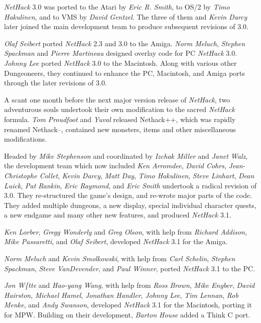 {\it NetHack\/} 3.0 was ported to the Atari by {\it Eric R. Smith}, to OS/2 by
{\it Timo Hakulinen}, and to VMS by {\it David Gentzel}.  The three of them
and {\it Kevin Darcy\/} later joined the main development team to produce
subsequent revisions of 3.0.

{\it Olaf Seibert\/} ported {\it NetHack\/} 2.3 and 3.0 to the Amiga.
{\it Norm Meluch}, {\it Stephen Spackman\/} and {\it Pierre Martineau\/} designed
overlay code for PC {\it NetHack\/} 3.0.  {\it Johnny Lee\/} ported
{\it NetHack\/} 3.0 to the Macintosh.  Along with various other Dungeoneers, they
continued to enhance the PC, Macintosh, and Amiga ports through the later
revisions of 3.0.

A scant one month before the next major version release of {\it NetHack}, two
adventurous souls undertook their own modification to the sacred {\it NetHack\/}
formula. {\it Tom Proudfoot\/} and {\it Yuval\/} released Nethack++,  which was
rapidly renamed Nethack--,  contained new monsters,  items and
other miscellaneous modifications.

Headed by {\it Mike Stephenson\/} and coordinated by {\it Izchak Miller\/} and
{\it Janet Walz}, the development team which now included {\it Ken Arromdee},
{\it David Cohrs}, {\it Jean-Christophe Collet}, {\it Kevin Darcy},
{\it Matt Day}, {\it Timo Hakulinen}, {\it Steve Linhart}, {\it Dean Luick},
{\it Pat Rankin}, {\it Eric Raymond}, and {\it Eric Smith\/} undertook a radical
revision of 3.0.  They re-structured the game's design, and re-wrote major
parts of the code.  They added multiple dungeons, a new display, special
individual character quests, a new endgame and many other new features, and
produced {\it NetHack\/} 3.1.

{\it Ken Lorber}, {\it Gregg Wonderly\/} and {\it Greg Olson}, with help
from {\it Richard Addison}, {\it Mike Passaretti}, and {\it Olaf Seibert},
developed {\it NetHack\/} 3.1 for the Amiga.

{\it Norm Meluch\/} and {\it Kevin Smolkowski}, with help from
{\it Carl Schelin}, {\it Stephen Spackman}, {\it Steve VanDevender},
and {\it Paul Winner}, ported {\it NetHack\/} 3.1 to the PC.

{\it Jon W\{tte\/} and {\it Hao-yang Wang}, with help from {\it Ross Brown},
{\it Mike Engber}, {\it David Hairston}, {\it Michael Hamel},
{\it Jonathan Handler}, {\it Johnny Lee}, {\it Tim Lennan}, {\it Rob Menke},
and {\it Andy Swanson}, developed {\it NetHack\/} 3.1 for the Macintosh,
porting it for MPW.  Building on their development, {\it Barton House\/}
added a Think C port.

